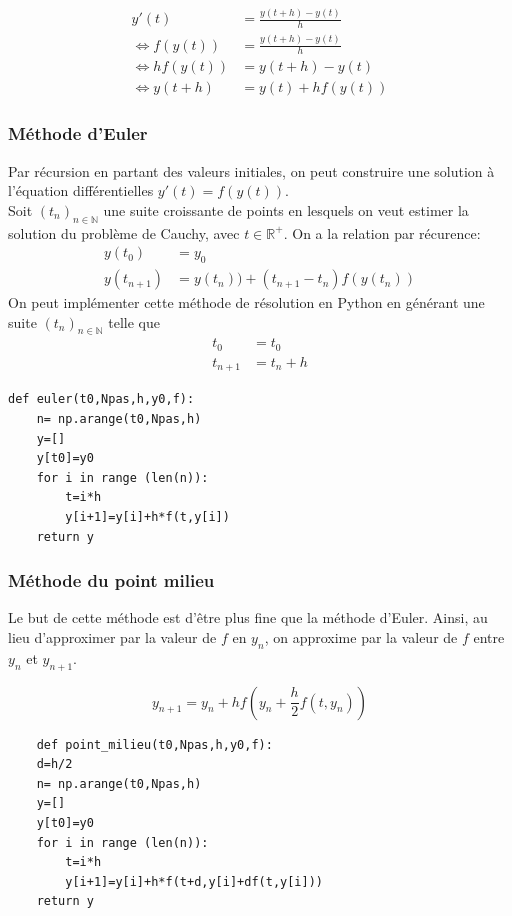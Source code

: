 \documentclass[a4paper]{article}
\theoremstyle{plain}
\theoremstyle{definition}
\theoremstyle{remark}
\begin{document}
\begin{align*}
y'(t)&=\frac{y(t+h)-y(t)}{h}\\
\Longleftrightarrow f(y(t))&=\frac{y(t+h)-y(t)}{h}\\
\Longleftrightarrow hf(y(t))&=y(t+h)-y(t)\\
\Longleftrightarrow y(t+h)&=y(t)+hf(y(t))
\end{align*}
\subsubsection{Méthode d'Euler}
Par récursion en partant des valeurs initiales, on peut construire une solution à l'équation différentielles $y'(t)=f(y(t))$.\\
Soit $(t_n)_{n\in\mathbb{N}}$ une suite croissante de points en lesquels on veut estimer la solution du problème de Cauchy, avec $t\in \mathbb{R}^+$. On a la relation par récurence:
\begin{align}
    y(t_0)&=y_0\\
    y(t_{n+1})&=y(t_n))+(t_{n+1}-t_n)f(y(t_n))
\end{align}
On peut implémenter cette méthode de résolution en Python en générant une suite $(t_n)_{n\in\mathbb{N}}$ telle que 
\begin{align*}
  t_0&=t_0\\
  t_{n+1}&=t_n+h
\end{align*}
\begin{verbatim}
def euler(t0,Npas,h,y0,f):
    n= np.arange(t0,Npas,h)
    y=[]
    y[t0]=y0
    for i in range (len(n)):
        t=i*h
        y[i+1]=y[i]+h*f(t,y[i])
    return y
\end{verbatim}


\subsubsection{Méthode du point milieu}
Le but de cette méthode est d'être plus fine que la méthode d'Euler. Ainsi, au lieu d'approximer par la valeur de $f$ en $y_n$, on approxime par la valeur de $f$ entre $y_n$ et $y_{n+1}$. 

$$y_{n+1} = y_n + h f \left(y_n + \frac{h}{2} f \left( t, y_n \right) \right)$$

\begin{verbatim}
    def point_milieu(t0,Npas,h,y0,f):
    d=h/2
    n= np.arange(t0,Npas,h)
    y=[]
    y[t0]=y0
    for i in range (len(n)):
        t=i*h
        y[i+1]=y[i]+h*f(t+d,y[i]+df(t,y[i]))
    return y
\end{verbatim}
\end{document}
